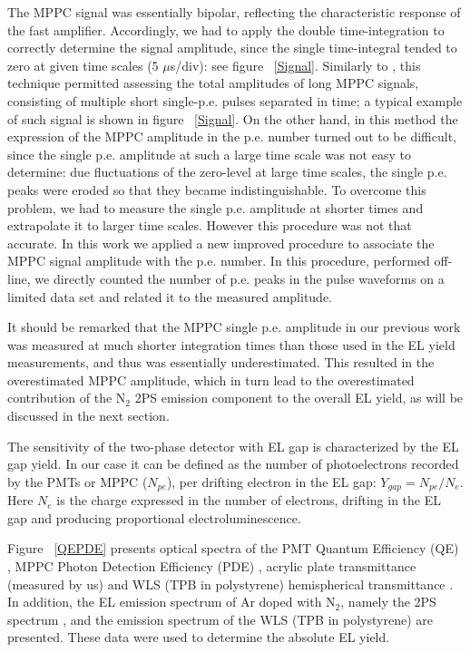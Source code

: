 \documentclass[a4paper,11pt]{article}
\begin{document}
The MPPC signal was essentially bipolar, reflecting the characteristic response of the fast amplifier. Accordingly, we had to apply the double time-integration to correctly determine the signal amplitude, since the single time-integral tended to zero at given time scales (5 $\mu$s/div): see  figure ~\ref{Signal}. Similarly to \cite{THGEMGAPD10}, this technique permitted assessing the total amplitudes of long MPPC signals, consisting of multiple short single-p.e. pulses separated in time; a typical example of such signal is shown in figure ~\ref{Signal}. On the other hand, in this method the expression of the MPPC amplitude in the p.e. number turned out to be difficult, since the single p.e. amplitude at such a large time scale was not easy to determine: due fluctuations of the zero-level at large time scales, the single p.e. peaks were eroded so that they became indistinguishable. To overcome this problem, we had to measure the single p.e. amplitude at shorter times and extrapolate it to larger time scales. However this procedure  was not that accurate. In this work we applied a new improved procedure to associate the MPPC signal amplitude with the p.e. number. In this procedure, performed off-line, we directly counted the number of p.e. peaks in the pulse waveforms on a limited data set and related it to the measured amplitude.

It should be remarked that the MPPC single p.e. amplitude in our previous work \cite{CRADPropEL15} was measured at much shorter integration times than those used in the EL yield measurements, and thus was essentially underestimated. This resulted in the overestimated MPPC amplitude, which in turn lead to the overestimated contribution of the N$_2$ 2PS emission component to the overall EL yield, as will be discussed in the next section.

The sensitivity of the two-phase detector with EL gap is characterized by the EL gap yield. In our case it can be defined as the number of photoelectrons recorded by the PMTs or MPPC ($N_{pe}$), per drifting electron in the EL gap: $Y_{gap}=N_{pe}/N_e $. Here $N_e$ is the charge expressed in the number of electrons, drifting in the EL gap and producing proportional electroluminescence.

Figure ~\ref{QEPDE} presents optical spectra of the PMT Quantum Efficiency (QE) \cite{Hamamatsu,PMTQE}, MPPC Photon Detection Efficiency (PDE) \cite{CryoMPPC15,Hamamatsu}, acrylic plate transmittance (measured by us) and WLS (TPB in polystyrene) hemispherical transmittance \cite{TPB2}. In addition, the EL emission spectrum of Ar doped with N$_2$, namely the 2PS spectrum \cite{Takahashi83}, and the emission spectrum of the WLS (TPB in polystyrene) \cite{TPB1} are presented. These data were used to determine the absolute EL yield.
\end{document}
